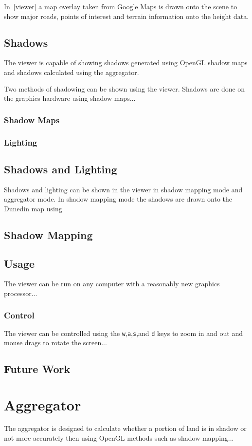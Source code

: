 \documentclass[12pt]{report}
\begin{document}
In~\ref{viewer} a map overlay taken from Google Maps\cite{gmaps} is drawn onto the scene to show major roads, points of interest and terrain information onto the height data. 

\section{Shadows}
The viewer is capable of showing shadows generated using OpenGL shadow maps and shadows calculated using the aggregator. 

Two methods of shadowing can be shown using the viewer. 
Shadows are done on the graphics hardware using shadow maps...
\subsection{Shadow Maps}
\subsection{Lighting}
\section{Shadows and Lighting}
Shadows and lighting can be shown in the viewer in shadow mapping mode and aggregator mode. In shadow mapping mode the shadows are drawn onto the Dunedin map using 

\section{Shadow Mapping}

\section{Usage}
The viewer can be run on any computer with a reasonably new graphics processor...
\subsection{Control}
The viewer can be controlled using the \texttt{w},\texttt{a},\texttt{s},and \texttt{d} keys to zoom in and out and mouse drags to rotate the screen...
\section{Future Work}
\chapter{Aggregator}
The aggregator is designed to calculate whether a portion of land is in shadow or not more accurately then using OpenGL methods such as shadow mapping...
\end{document}
